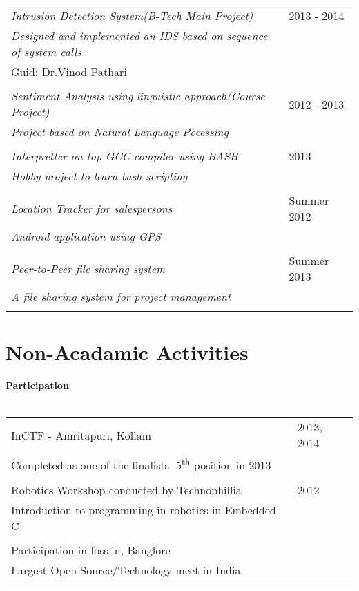 \documentclass[a4paper,10pt]{article} %
\begin{document}
\begin{tabular}{p{11cm}p{11cm}}	
\emph{Intrusion Detection System(B-Tech Main Project)} & 2013 - 2014\\
\emph{Designed and implemented an IDS based on sequence of system calls}&\\
\normalsize{Guid: Dr.Vinod Pathari}&\\
&\\

\emph{Sentiment Analysis using linguistic approach(Course Project)} & 2012 - 2013\\
\emph{Project based on Natural Language Pocessing}&\\
&\\

\emph{Interpretter on top GCC compiler using BASH} & 2013 \\
\emph{Hobby project to learn bash scripting} & \\
&\\

\emph{Location Tracker for salespersons} & Summer 2012\\
\emph{Android application using GPS}&\\
&\\

\emph{Peer-to-Peer file sharing system} & Summer 2013\\
\emph{A file sharing system for project management}&\\
&\\
        
\end{tabular}



\section{Non-Acadamic Activities}

\textbf{Participation}\\ \\
\begin{tabular}{p{11cm}p{11cm}}
InCTF - Amritapuri, Kollam & 2013, 2014\\
Completed as one of the finalists. 5\textsuperscript{th} position in 2013 &\\ \\
Robotics Workshop conducted by Technophillia & 2012 \\
Introduction to programming in robotics in Embedded C &\\ \\
Participation in foss.in, Banglore &\\
Largest Open-Source/Technology meet in India &\\ \\
\end{tabular}
\end{document}
